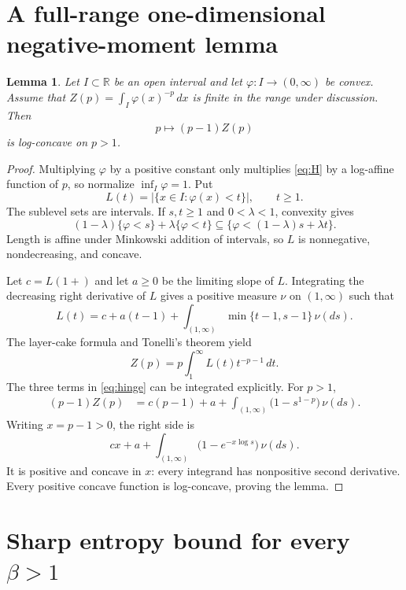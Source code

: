 \documentclass[11pt]{article}
\newtheorem{lemma}{Lemma}
\newcommand{\R}{\mathbb R}
\begin{document}
\section{A full-range one-dimensional negative-moment lemma}

\begin{lemma}\label{lem:moment}
Let $I\subset\R$ be an open interval and let
$\varphi:I\to(0,\infty)$ be convex. Assume that
$Z(p)=\int_I\varphi(x)^{-p}\,dx$ is finite in the range under discussion.
Then
\begin{equation}\label{eq:H}
 p\longmapsto (p-1)Z(p)
\end{equation}
is log-concave on $p>1$.
\end{lemma}

\begin{proof}
Multiplying $\varphi$ by a positive constant only multiplies \eqref{eq:H} by
a log-affine function of $p$, so normalize $\inf_I\varphi=1$. Put
\[
 L(t)=\bigl|\{x\in I:\varphi(x)<t\}\bigr|,\qquad t\geq1.
\]
The sublevel sets are intervals. If $s,t\geq1$ and $0<\lambda<1$, convexity
gives
\[
 (1-\lambda)\{\varphi<s\}+\lambda\{\varphi<t\}
 \subseteq
 \{\varphi<(1-\lambda)s+\lambda t\}.
\]
Length is affine under Minkowski addition of intervals, so $L$ is
nonnegative, nondecreasing, and concave.

Let $c=L(1+)$ and let $a\geq0$ be the limiting slope of $L$. Integrating the
decreasing right derivative of $L$ gives a positive measure $\nu$ on
$(1,\infty)$ such that
\begin{equation}\label{eq:hinge}
 L(t)=c+a(t-1)+\int_{(1,\infty)}\min\{t-1,s-1\}\,\nu(ds).
\end{equation}
The layer-cake formula and Tonelli's theorem yield
\[
 Z(p)=p\int_1^\infty L(t)t^{-p-1}\,dt.
\]
The three terms in \eqref{eq:hinge} can be integrated explicitly. For $p>1$,
\begin{align*}
 (p-1)Z(p)
 &=c(p-1)+a
   +\int_{(1,\infty)}\bigl(1-s^{1-p}\bigr)\,\nu(ds).
\end{align*}
Writing $x=p-1>0$, the right side is
\[
 cx+a+\int_{(1,\infty)}\bigl(1-e^{-x\log s}\bigr)\,\nu(ds).
\]
It is positive and concave in $x$: every integrand has nonpositive second
derivative. Every positive concave function is log-concave, proving the
lemma.
\end{proof}

\section{Sharp entropy bound for every \texorpdfstring{$\beta>1$}{beta > 1}}
\end{document}
